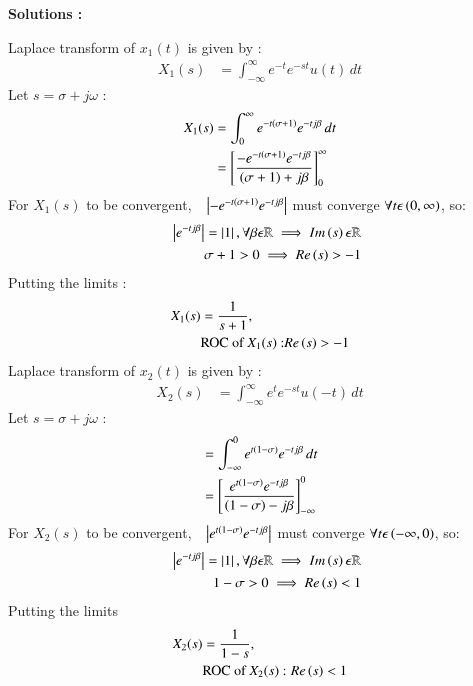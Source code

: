 \documentclass[journal,12pt,onecolumn]{IEEEtran}
\theoremstyle{remark}
\begin{document}
\textbf{Solutions :}
    
Laplace transform of $x_1(t)$ is given by :
\begin{align}
    X_1(s) &=  \int_{-\infty}^{\infty} e^{-t}e^{-st}u(t) \,dt
    \end{align}
    Let $s=\sigma+j\omega$ :
\begin{align}
 X_1(s) &= \int_{0}^{\infty}e^{-t\left(\sigma+1\right)}e^{-tj\beta} \,dt\\
       &=  \left[\frac{-e^{-t\left(\sigma+1\right)}e^{-tj\beta}}{\left(\sigma+1\right)+j\beta}\right]_{0}^{\infty}  \\
       \end{align}
        For $X_1(s)$ to be convergent,$\quad\left\vert-e^{-t\left(\sigma+1\right)}e^{-tj\beta}\right\vert$ must converge $\forall t \epsilon \left(0,\infty\right)$, so:
        \begin{align}
\quad\left\vert e^{-tj\beta}\right\vert = \left\vert1\right\vert, \forall \beta \epsilon \mathbb{R} \implies Im\left(s\right) \epsilon \mathbb{R}\\
\sigma + 1 > 0 \implies  Re\left(s\right)>-1   
        \end{align}
Putting the limits :
       \begin{align}
X_1(s)&= \frac{1}{s+1} , \\ &\text{ROC of $X_1(s)$ :} Re\left(s\right) > -1
\end{align}
Laplace transform of $x_2(t)$ is given by :
\begin{align}
    X_2(s) &=  \int_{-\infty}^{\infty} e^{t}e^{-st}u(-t) \,dt
        \end{align}
    Let $s=\sigma+j\omega$ :
\begin{align}
    &= \int_{-\infty}^{0}e^{t\left(1-\sigma\right)}e^{-tj\beta} \,dt\\
      &=  \left[\frac{e^{t\left(1-\sigma\right)}e^{-tj\beta}}{\left(1-\sigma\right)-j\beta}\right]_{-\infty}^{0}  
     \end{align}
      For $X_2(s)$ to be convergent,$\quad\left\vert e^{t\left(1-\sigma\right)}e^{-tj\beta}\right\vert$ must converge $\forall t\epsilon\left(-\infty,0\right)$, so:
     \begin{align}
\quad\left\vert e^{-tj\beta}\right\vert = \left\vert1\right\vert, \forall \beta \epsilon \mathbb{R} \implies Im\left(s\right) \epsilon \mathbb{R}\\
1-\sigma > 0 \implies  Re\left(s\right) < 1 
        \end{align}
Putting the limits 
     \begin{align}
            X_2(s)&= \frac{1}{1-s} , \\ &\text{ROC of $X_2(s)$ : }Re\left(s\right) < 1
\end{align}
\end{document}
